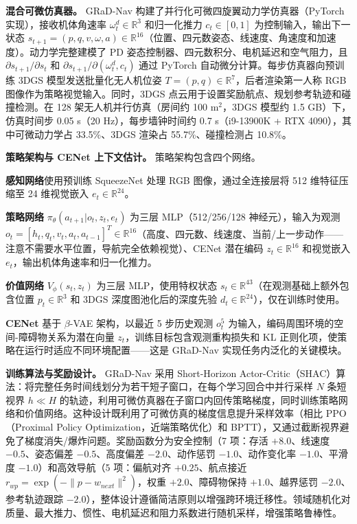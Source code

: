 \textbf{混合可微仿真器。}
GRaD-Nav 构建了并行化可微四旋翼动力学仿真器（PyTorch 实现），接收机体角速率 $\omega^d_t \in \mathbb{R}^3$ 和归一化推力 $c_t \in [0,1]$ 为控制输入，输出下一状态 $s_{t+1} = (p, q, v, \omega, a) \in \mathbb{R}^{16}$（位置、四元数姿态、线速度、角速度和加速度）。动力学完整建模了 PD 姿态控制器、四元数积分、电机延迟和空气阻力，且 $\partial s_{t+1}/\partial s_t$ 和 $\partial s_{t+1}/\partial(\omega^d_t, c_t)$ 通过 PyTorch 自动微分计算。每步仿真器向预训练 3DGS 模型发送批量化无人机位姿 $T = (p, q) \in \mathbb{R}^7$，后者渲染第一人称 RGB 图像作为策略视觉输入。同时，3DGS 点云用于设置奖励航点、规划参考轨迹和碰撞检测。在 128 架无人机并行仿真（房间约 100 m$^2$，3DGS 模型约 1.5 GB）下，仿真时间步 0.05 s（20 Hz），每步墙钟时间约 0.7 s（i9-13900K + RTX 4090），其中可微动力学占 33.5\%、3DGS 渲染占 55.7\%、碰撞检测占 10.8\%。

\textbf{策略架构与 CENet 上下文估计。}
策略架构包含四个网络。

\textbf{感知网络}使用预训练 SqueezeNet 处理 RGB 图像，通过全连接层将 512 维特征压缩至 24 维视觉嵌入 $e_t \in \mathbb{R}^{24}$。

\textbf{策略网络} $\pi_\theta(a_{t+1}|o_t, z_t, e_t)$ 为三层 MLP（512/256/128 神经元），输入为观测 $o_t = [h_t, q_t, v_t, a_t, a_{t-1}]^T \in \mathbb{R}^{16}$（高度、四元数、线速度、当前/上一步动作——注意不需要水平位置，导航完全依赖视觉）、CENet 潜在编码 $z_t \in \mathbb{R}^{16}$ 和视觉嵌入 $e_t$，输出机体角速率和归一化推力。

\textbf{价值网络} $V_\phi(s_t, z_t)$ 为三层 MLP，使用特权状态 $s_t \in \mathbb{R}^{43}$（在观测基础上额外包含位置 $p_t \in \mathbb{R}^3$ 和 3DGS 深度图池化后的深度先验 $d_t \in \mathbb{R}^{24}$），仅在训练时使用。

\textbf{CENet} 基于 $\beta$-VAE 架构，以最近 5 步历史观测 $o_t^5$ 为输入，编码周围环境的空间-障碍物关系为潜在向量 $z_t$，训练目标包含观测重构损失和 KL 正则化项，使策略在运行时适应不同环境配置——这是 GRaD-Nav 实现任务内泛化的关键模块。

\textbf{训练算法与奖励设计。}
GRaD-Nav 采用 Short-Horizon Actor-Critic（SHAC）算法：将完整任务时间线划分为若干短子窗口，在每个学习回合中并行采样 $N$ 条短视界 $h \ll H$ 的轨迹，利用可微仿真器在子窗口内回传策略梯度，同时训练策略网络和价值网络。这种设计既利用了可微仿真的梯度信息提升采样效率（相比 PPO（Proximal Policy Optimization，近端策略优化）和 BPTT），又通过截断视界避免了梯度消失/爆炸问题。奖励函数分为安全控制（7 项：存活 $+8.0$、线速度 $-0.5$、姿态偏差 $-0.5$、高度偏差 $-2.0$、动作惩罚 $-1.0$、动作变化率 $-1.0$、平滑度 $-1.0$）和高效导航（5 项：偏航对齐 $+0.25$、航点接近 $r_{wp} = \exp(-\|p - w_{next}\|^2)$，权重 $+2.0$、障碍物保持 $+1.0$、越界惩罚 $-2.0$、参考轨迹跟踪 $-2.0$），整体设计遵循简洁原则以增强跨环境迁移性。领域随机化对质量、最大推力、惯性、电机延迟和阻力系数进行随机采样，增强策略鲁棒性。

